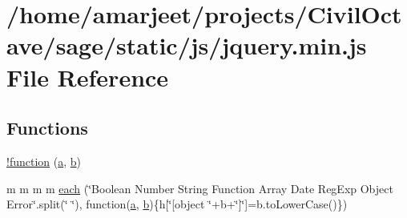 \hypertarget{a00030}{}\section{/home/amarjeet/projects/\+Civil\+Octave/sage/static/js/jquery.min.\+js File Reference}
\label{a00030}
\subsection*{Functions}
\begin{DoxyCompactItemize}
\item 
\hyperlink{a00030_a43f0b96ea8ec44ca20ba86809a785614}{!function} (\hyperlink{a00029_a1f5870dcf487187f13d5fd328ed9e6e7}{a}, \hyperlink{a00029_a398bb8542498d1b14178b02b99df309b}{b})
\item 
m m m m \hyperlink{a00030_a18d9b499a0765bf2fe5f372ff2fc0236}{each} (\char`\"{}Boolean Number String Function Array Date Reg\+Exp Object Error\char`\"{}.split(\char`\"{} \char`\"{}), function(\hyperlink{a00029_a1f5870dcf487187f13d5fd328ed9e6e7}{a}, \hyperlink{a00029_a398bb8542498d1b14178b02b99df309b}{b})\{h\mbox{[}\char`\"{}\mbox{[}object \char`\"{}+b+\char`\"{}\mbox{]}\char`\"{}\mbox{]}=b.\+to\+Lower\+Case()\})
\item 

\end{DoxyCompactItemize}
